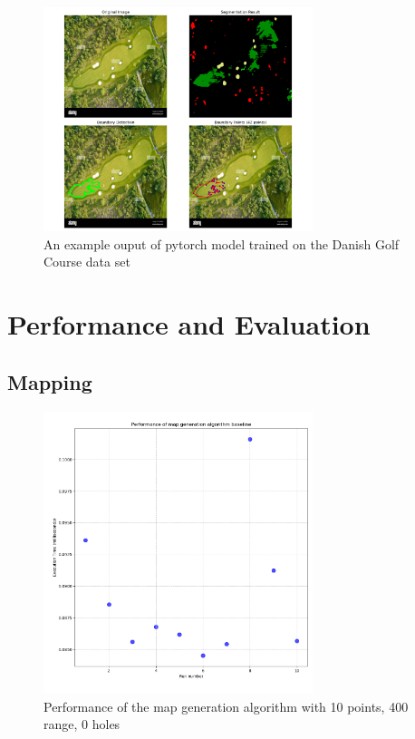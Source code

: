 \documentclass[final]{cmpreport_02}
\begin{document}
\begin{figure}[h!]
	\centering
	\includegraphics[width=0.7\textwidth]{./images/overheadGolfCourse_visualisation.png}
	\caption{An example ouput of pytorch model trained on the Danish Golf Course data set}
	\label{am:ohGCDanish}
\end{figure}

\section{Performance and Evaluation}
\subsection{Mapping}


\begin{figure}[h!]
	\centering
	\includegraphics[width=0.7\textwidth]{./images/mapGenBaselineRT.png}
	\caption{Performance of the map generation algorithm with 10 points, 400 range, 0 holes}
	\label{PE:mg:baselineRT}
\end{figure}
\end{document}

